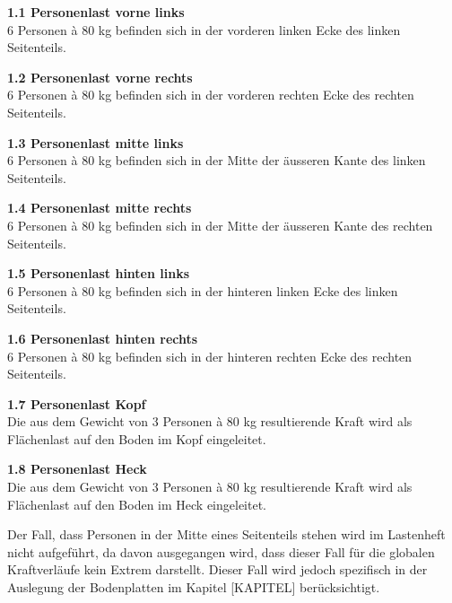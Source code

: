\begin{description}
  \item \textbf{1.1 Personenlast vorne links}\\
  6 Personen à 80 kg befinden sich in der vorderen linken Ecke des linken Seitenteils.
  \item \textbf{1.2 Personenlast vorne rechts}\\
  6 Personen à 80 kg befinden sich in der vorderen rechten Ecke des rechten Seitenteils.
  \item \textbf{1.3 Personenlast mitte links}\\
  6 Personen à 80 kg befinden sich in der Mitte der äusseren Kante des linken Seitenteils.
  \item \textbf{1.4 Personenlast mitte rechts}\\
  6 Personen à 80 kg befinden sich in der Mitte der äusseren Kante des rechten Seitenteils.
  \item \textbf{1.5 Personenlast hinten links}\\
  6 Personen à 80 kg befinden sich in der hinteren linken Ecke des linken Seitenteils.
  \item \textbf{1.6 Personenlast hinten rechts}\\
  6 Personen à 80 kg befinden sich in der hinteren rechten Ecke des rechten Seitenteils.
  \item \textbf{1.7 Personenlast Kopf}\\
  Die aus dem Gewicht von 3 Personen à 80 kg resultierende Kraft wird als Flächenlast auf den Boden im Kopf eingeleitet.
  \item \textbf{1.8 Personenlast Heck}\\
  Die aus dem Gewicht von 3 Personen à 80 kg resultierende Kraft wird als Flächenlast auf den Boden im Heck eingeleitet.
\end{description}

Der Fall, dass Personen in der Mitte eines Seitenteils stehen wird im Lastenheft nicht aufgeführt, da davon ausgegangen wird, dass dieser Fall für die globalen Kraftverläufe kein Extrem darstellt. Dieser Fall wird jedoch spezifisch in der Auslegung der Bodenplatten im Kapitel [KAPITEL] berücksichtigt.

